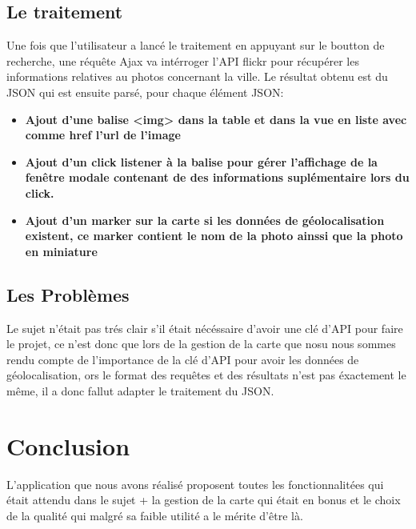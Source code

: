 \documentclass[a4paper, 11pt]{article}
\begin{document}
	\subsection*{Le traitement}
	Une fois que l'utilisateur a lancé le traitement en appuyant sur le boutton de recherche, une réquête Ajax va intérroger l'API flickr pour récupérer les informations relatives au photos concernant la ville. Le résultat obtenu est du JSON qui est ensuite parsé, pour chaque élément JSON:
        \newline
        \begin{itemize}
            \item \textbf{Ajout d'une balise <img> dans la table et dans la vue en liste avec comme href l'url de l'image}
            \item \textbf{Ajout d'un click listener à la balise pour gérer l'affichage de la fenêtre modale contenant de des informations suplémentaire lors du click.}
            \item \textbf{Ajout d'un marker sur la carte si les données de géolocalisation existent, ce marker contient le nom de la photo ainssi que la photo en miniature}
        \end{itemize}
	\subsection*{Les Problèmes}
        Le sujet n'était pas trés clair s'il était nécéssaire d'avoir une clé d'API pour faire le projet, ce n'est donc que lors de la gestion de la carte que nosu nous sommes rendu compte de l'importance de la clé d'API pour avoir les données de géolocalisation, ors le format des requêtes et des résultats n'est pas éxactement le même, il a donc fallut adapter le traitement du JSON.

\section*{Conclusion }
L'application que nous avons réalisé proposent toutes les fonctionnalitées qui était attendu dans le sujet + la gestion de la carte qui était en bonus et le choix de la qualité qui malgré sa faible utilité a le mérite d'être là.
\end{document}
